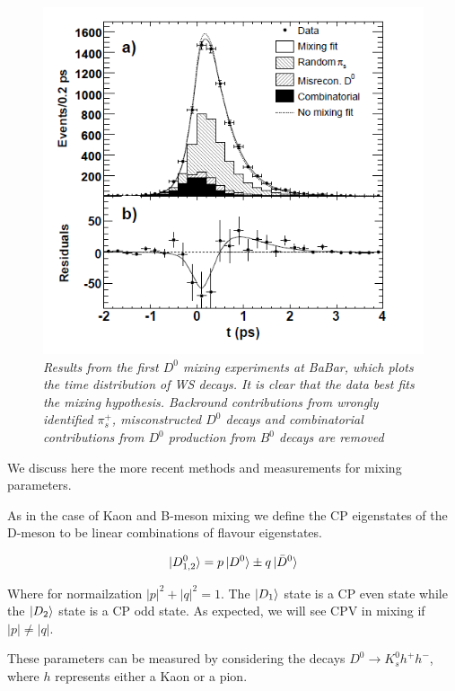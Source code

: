 \begin{figure}[h!]
\begin{center}
\includegraphics[scale=0.4]{figs/BaBar_D0_Mixing_Results.png}
\end{center}
\caption{\textit{Results from the first $D^{0}$ mixing experiments at BaBar, which plots the time distribution of WS decays. It is clear that the data best fits the mixing hypothesis. Backround contributions from wrongly identified $\pi^{+}_{s}$, misconstructed $D^{0}$ decays and combinatorial contributions from $D^{0}$ production from $B^{0}$ decays are removed}}
\label{BaBar_D0_Mixing_Results.png}
\end{figure}






We discuss here the more recent methods and measurements for mixing parameters.

As in the case of Kaon and B-meson mixing we define the CP eigenstates of the D-meson to be linear combinations of flavour eigenstates.

\begin{equation*}
\ket{D^{0}_{1,2}} = p \ket{D^{0}} \pm q \ket{\bar{D}^{0}}
\end{equation*}

\noindent Where for normailzation $|p|^{2}+|q|^{2} = 1$. The $\ket{D_{1}}$ state is a CP even state while the $\ket{D_{2}}$ state is a CP odd state. As expected, we will see CPV in mixing if $|p| \neq |q|$. 

These parameters can be measured by considering the decays $D^{0} \rightarrow K^{0}_{s} h^{+} h^{-}$, where $h$ represents either a Kaon or a pion.
